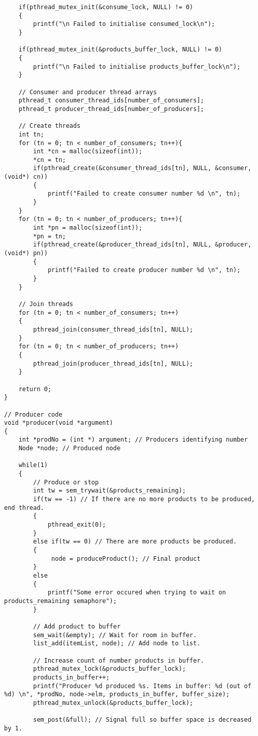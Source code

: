 \begin{lstlisting}
	if(pthread_mutex_init(&consume_lock, NULL) != 0)
    {
        printf("\n Failed to initialise consumed_lock\n");
    }
	
	if(pthread_mutex_init(&products_buffer_lock, NULL) != 0)
    {
        printf("\n Failed to initialise products_buffer_lock\n");
    }
	
	// Consumer and producer thread arrays
	pthread_t consumer_thread_ids[number_of_consumers];
	pthread_t producer_thread_ids[number_of_producers];
	
	// Create threads
	int tn;
	for (tn = 0; tn < number_of_consumers; tn++){
		int *cn = malloc(sizeof(int));
		*cn = tn;
        if(pthread_create(&consumer_thread_ids[tn], NULL, &consumer, (void*) cn))
		{
        	printf("Failed to create consumer number %d \n", tn);
        }
    }
	for (tn = 0; tn < number_of_producers; tn++){
        int *pn = malloc(sizeof(int));
		*pn = tn;
		if(pthread_create(&producer_thread_ids[tn], NULL, &producer, (void*) pn))
		{
        	printf("Failed to create producer number %d \n", tn);
        }
    }
	
	// Join threads
	for (tn = 0; tn < number_of_consumers; tn++)
	{
    	pthread_join(consumer_thread_ids[tn], NULL);
    }
	for (tn = 0; tn < number_of_producers; tn++)
	{
    	pthread_join(producer_thread_ids[tn], NULL);
    }
	
	return 0;
}

// Producer code
void *producer(void *argument)
{
	int *prodNo = (int *) argument; // Producers identifying number
	Node *node; // Produced node
	
	while(1)
	{
		// Produce or stop
		int tw = sem_trywait(&products_remaining);
		if(tw == -1) // If there are no more products to be produced, end thread.
		{
			pthread_exit(0);
		}
		else if(tw == 0) // There are more products be produced.
		{	
			 node = produceProduct(); // Final product
		}
		else
		{
			printf("Some error occured when trying to wait on products_remaining semaphore");
		}
		
		// Add product to buffer
		sem_wait(&empty); // Wait for room in buffer.
		list_add(itemList, node); // Add node to list.
		
		// Increase count of number products in buffer.
		pthread_mutex_lock(&products_buffer_lock);
		products_in_buffer++;
		printf("Producer %d produced %s. Items in buffer: %d (out of %d) \n", *prodNo, node->elm, products_in_buffer, buffer_size);
		pthread_mutex_unlock(&products_buffer_lock);
		
		sem_post(&full); // Signal full so buffer space is decreased by 1.
		

\end{lstlisting}
